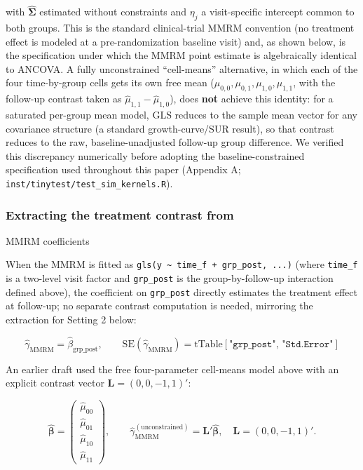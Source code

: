 \documentclass[
  11pt,
]{article}
\begin{document}
with \(\hat{\mathbf{\Sigma}}\) estimated without
constraints and \(\eta_j\) a visit-specific intercept common
to both groups. This is the standard clinical-trial MMRM
convention (no treatment effect is modeled at a
pre-randomization baseline visit) and, as shown below, is
the specification under which the MMRM point estimate is
algebraically identical to ANCOVA. A fully unconstrained
``cell-means'' alternative, in which each of the four
time-by-group cells gets its own free mean
(\(\mu_{0,0}, \mu_{0,1}, \mu_{1,0}, \mu_{1,1}\), with the
follow-up contrast taken as \(\hat\mu_{1,1} -
\hat\mu_{1,0}\)), does \textbf{not} achieve this identity: for a
saturated per-group mean model, GLS reduces to the sample
mean vector for any covariance structure (a standard
growth-curve/SUR result), so that contrast reduces to the
raw, baseline-unadjusted follow-up group difference. We
verified this discrepancy numerically before adopting the
baseline-constrained specification used throughout this
paper (Appendix A; \texttt{inst/tinytest/test\_sim\_kernels.R}).

\subsubsection{Extracting the treatment contrast from}\label{extracting-the-treatment-contrast-from}

MMRM coefficients

When the MMRM is fitted as \texttt{gls(y\ \textasciitilde{}\ time\_f\ +\ grp\_post,\ ...)} (where \texttt{time\_f} is a two-level visit factor and
\texttt{grp\_post} is the group-by-follow-up interaction defined
above), the coefficient on \texttt{grp\_post} directly estimates
the treatment effect at follow-up; no separate contrast
computation is needed, mirroring the extraction for
Setting 2 below:

\[
\hat{\gamma}_{\mathrm{MMRM}} =
\hat{\beta}_{\mathrm{grp\_post}}, \qquad
\mathrm{SE}(\hat{\gamma}_{\mathrm{MMRM}}) =
\text{tTable}[\texttt{"grp\_post"},\,
\texttt{"Std.Error"}]
\]

An earlier draft used the free four-parameter cell-means
model above with an explicit contrast vector
\(\mathbf{L} = (0, 0, -1, 1)'\):

\[
\hat{\mathbf{\beta}} = \begin{pmatrix}
\hat{\mu}_{00} \\ \hat{\mu}_{01} \\
\hat{\mu}_{10} \\ \hat{\mu}_{11}
\end{pmatrix}, \qquad
\hat{\gamma}_{\mathrm{MMRM}}^{(\mathrm{unconstrained})} =
\mathbf{L}'\hat{\mathbf{\beta}}, \quad
\mathbf{L} = (0, 0, -1, 1)'.
\]
\end{document}
